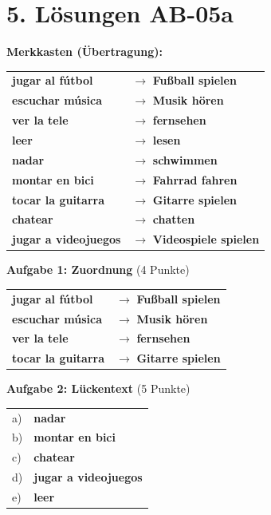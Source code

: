 \documentclass[11pt, a4paper]{article}
\newcommand{\fachfarbe}{spanisch}
\newcommand{\sequenz}{05}
\newcommand{\block}{a}
\newcommand{\loesung}[1]{\textcolor{loesung}{\textbf{#1}}}
\newcommand{\es}[1]{\textcolor{\fachfarbe}{\textbf{#1}}}
\begin{document}

\section*{5. Lösungen AB-\sequenz\block}

\textbf{Merkkasten (Übertragung):}

\begin{tabular}{ll}
\es{jugar al fútbol} & $\rightarrow$ \loesung{Fußball spielen} \\
\es{escuchar música} & $\rightarrow$ \loesung{Musik hören} \\
\es{ver la tele} & $\rightarrow$ \loesung{fernsehen} \\
\es{leer} & $\rightarrow$ \loesung{lesen} \\
\es{nadar} & $\rightarrow$ \loesung{schwimmen} \\
\es{montar en bici} & $\rightarrow$ \loesung{Fahrrad fahren} \\
\es{tocar la guitarra} & $\rightarrow$ \loesung{Gitarre spielen} \\
\es{chatear} & $\rightarrow$ \loesung{chatten} \\
\es{jugar a videojuegos} & $\rightarrow$ \loesung{Videospiele spielen} \\
\end{tabular}

\vspace{1em}

\textbf{Aufgabe 1: Zuordnung} (4 Punkte)

\begin{tabular}{ll}
\es{jugar al fútbol} & $\rightarrow$ \loesung{Fußball spielen} \\
\es{escuchar música} & $\rightarrow$ \loesung{Musik hören} \\
\es{ver la tele} & $\rightarrow$ \loesung{fernsehen} \\
\es{tocar la guitarra} & $\rightarrow$ \loesung{Gitarre spielen} \\
\end{tabular}

\vspace{1em}

\textbf{Aufgabe 2: Lückentext} (5 Punkte)

\begin{tabular}{ll}
a) & \loesung{nadar} \\
b) & \loesung{montar en bici} \\
c) & \loesung{chatear} \\
d) & \loesung{jugar a videojuegos} \\
e) & \loesung{leer} \\
\end{tabular}
\end{document}
